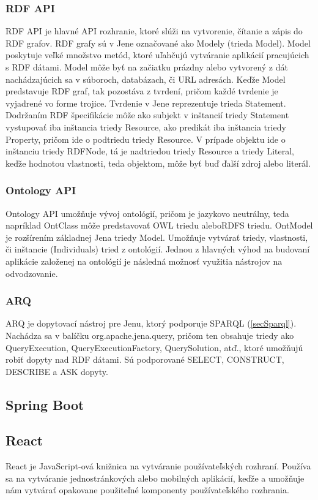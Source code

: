 \subsubsection{RDF API}
RDF API je hlavné API rozhranie, ktoré slúži na vytvorenie, čítanie a zápis do RDF grafov. RDF grafy sú v Jene označované ako Modely (trieda Model). Model poskytuje veľké množstvo metód, ktoré uľahčujú vytváranie aplikácií pracujúcich s RDF dátami. Model môže byť na začiatku prázdny alebo vytvorený z dát nachádzajúcich sa v súboroch, databázach, či URL adresách. Keďže Model predstavuje RDF graf, tak pozostáva z tvrdení, pričom každé tvrdenie je vyjadrené vo forme trojice. Tvrdenie v Jene reprezentuje trieda Statement. Dodržaním RDF špecifikácie môže ako subjekt v inštancií triedy Statement vystupovať iba inštancia triedy Resource, ako predikát iba inštancia triedy Property, pričom ide o podtriedu triedy Resource. V prípade objektu ide o inštanciu triedy RDFNode, tá je nadtriedou triedy Resource a triedy Literal, keďže hodnotou vlastnosti, teda objektom, môže byť buď ďalší zdroj alebo literál. 

\subsubsection{Ontology API}
Ontology API umožňuje vývoj ontológií, pričom je jazykovo neutrálny, teda napríklad OntClass môže predstavovať OWL  triedu aleboRDFS triedu. OntModel je rozšírením základnej Jena triedy Model. Umožňuje vytvárať triedy, vlastnosti, či inštancie (Individuals) tried z ontológií. Jednou z hlavných výhod na budovaní aplikácie založenej na ontológií je následná možnosť využitia nástrojov na odvodzovanie.

\subsubsection{ARQ}
ARQ je dopytovací nástroj pre Jenu, ktorý podporuje SPARQL ({\ref{secSparql}}). Nachádza sa v balíčku org.apache.jena.query, pričom ten obsahuje triedy ako QueryExecution, QueryExecutionFactory, QuerySolution, atď., ktoré umožňujú robiť dopyty nad RDF dátami. Sú podporované SELECT, CONSTRUCT, DESCRIBE a ASK dopyty.

\subsection{Spring Boot} \label{secSpringBoot}

\subsection{React} \label{secReact}
React je JavaScript-ová knižnica na vytváranie používateľských rozhraní. Používa sa na vytváranie jednostránkových alebo mobilných aplikácií, keďže  a umožňuje nám vytvárať opakovane použiteľné komponenty používateľského rozhrania. 


